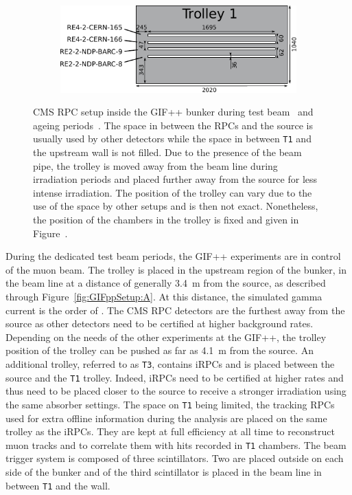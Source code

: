 \begin{figure}[H]
\begin{subfigure}{0.5\linewidth}
    	\end{subfigure}
    	\begin{subfigure}{\linewidth}
    		\vspace*{5mm}
			\centering
    		\includegraphics[width = 0.8\plotwidth]{fig/chapt5/GIFpp-T1.pdf}
        	\caption{\label{fig:GIFppSetup:C}}
    	\end{subfigure}
		\caption{\label{fig:GIFppSetup} CMS RPC setup inside the GIF++ bunker during test beam~ and ageing periods~. The space in between the RPCs and the source is usually used by other detectors while the space in between \texttt{T1} and the upstream wall is not filled. Due to the presence of the beam pipe, the trolley is moved away from the beam line during irradiation periods and placed further away from the source for less intense irradiation. The position of the trolley can vary due to the use of the space by other setups and is then not exact. Nonetheless, the position of the chambers in the trolley is fixed and given in Figure~.}
	\end{figure}
	
	During the dedicated test beam periods, the GIF++ experiments are in control of the muon beam. The trolley is placed in the upstream region of the bunker, in the beam line at a distance of generally \SI{3.4}{m} from the source, as described through Figure~\ref{fig:GIFppSetup:A}. At this distance, the simulated gamma current is the order of  \siflux. The CMS RPC detectors are the furthest away from the source as other detectors need to be certified at higher background rates. Depending on the needs of the other experiments at the GIF++, the trolley position of the trolley can be pushed as far as \SI{4.1}{m} from the source. An additional trolley, referred to as \texttt{T3}, contains iRPCs and is placed between the source and the \texttt{T1} trolley. Indeed, iRPCs need to be certified at higher rates and thus need to be placed closer to the source to receive a stronger irradiation using the same absorber settings. The space on \texttt{T1} being limited, the tracking RPCs used for extra offline information during the analysis are placed on the same trolley as the iRPCs. They are kept at full efficiency at all time to reconstruct muon tracks and to correlate them with hits recorded in \texttt{T1} chambers. The beam trigger system is composed of three scintillators. Two are placed outside on each side of the bunker and of the third scintillator is placed in the beam line in between \texttt{T1} and the wall.
	
